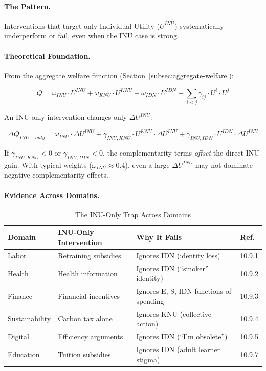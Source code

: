 \paragraph{The Pattern.}
Interventions that target only Individual Utility ($U^{INU}$) systematically 
underperform or fail, even when the INU case is strong.

\paragraph{Theoretical Foundation.}
From the aggregate welfare function (Section~\ref{subsec:aggregate-welfare}):

\begin{equation}
Q = \omega_{INU} \cdot U^{INU} + \omega_{KNU} \cdot U^{KNU} + \omega_{IDN} \cdot U^{IDN} + \sum_{i<j} \gamma_{ij} \cdot U^i \cdot U^j
\end{equation}

An INU-only intervention changes only $\Delta U^{INU}$:

\begin{equation}
\Delta Q_{INU-only} = \omega_{INU} \cdot \Delta U^{INU} + \gamma_{INU,KNU} \cdot U^{KNU} \cdot \Delta U^{INU} + \gamma_{INU,IDN} \cdot U^{IDN} \cdot \Delta U^{INU}
\end{equation}

If $\gamma_{INU,KNU} < 0$ or $\gamma_{INU,IDN} < 0$, the complementarity terms 
\emph{offset} the direct INU gain. With typical weights ($\omega_{INU} \approx 0.4$),
even a large $\Delta U^{INU}$ may not dominate negative complementarity effects.

\paragraph{Evidence Across Domains.}

\begin{table}[htbp]
\centering
\caption{The INU-Only Trap Across Domains}
\label{tab:inu-trap-evidence}
\renewcommand{\arraystretch}{1.3}
\begin{tabular}{@{}llll@{}}
\toprule
\textbf{Domain} & \textbf{INU-Only Intervention} & \textbf{Why It Fails} & \textbf{Ref.} \\
\midrule
Labor & Retraining subsidies & Ignores IDN (identity loss) & 10.9.1 \\
Health & Health information & Ignores IDN (``smoker'' identity) & 10.9.2 \\
Finance & Financial incentives & Ignores E, S, IDN functions of spending & 10.9.3 \\
Sustainability & Carbon tax alone & Ignores KNU (collective action) & 10.9.4 \\
Digital & Efficiency arguments & Ignores IDN (``I'm obsolete'') & 10.9.5 \\
Education & Tuition subsidies & Ignores IDN (adult learner stigma) & 10.9.7 \\
\bottomrule
\end{tabular}
\end{table}

